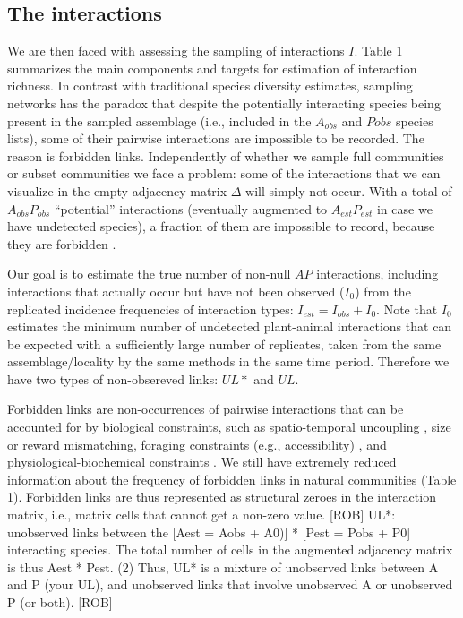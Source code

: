\documentclass[12pt]{article}
\begin{document}

\subsection*{The interactions}

We are then faced with assessing the sampling of interactions $I$. Table 1 summarizes the main components and targets for estimation of interaction richness. In contrast with traditional species diversity estimates, sampling networks has the paradox that despite the potentially interacting species being present in the sampled assemblage (i.e., included in the $A_{obs}$ and $P{obs}$ species lists), some of their pairwise interactions are impossible to be recorded. The reason is forbidden links. Independently of whether we sample full communities or subset communities we face a problem: some of the interactions that we can visualize in the empty adjacency matrix $\Delta$ will simply not occur. With a total of $A_{obs}P_{obs}$ ``potential'' interactions (eventually augmented to $A_{est}P_{est}$ in case we have undetected species), a fraction of them are impossible to record, because they are forbidden \citep{E31.7324_PDF,Olesen:2011a}. 

Our goal is to estimate the true number of non-null $AP$ interactions, including interactions that actually occur but have not been observed ($I_0$) from the replicated incidence frequencies of interaction types: $I_{est} = I_{obs} + I_0$. Note that $I_0$ estimates the minimum number of undetected plant-animal interactions that can be expected with a sufficiently large number of replicates, taken from the same assemblage/locality by the same methods in the same time period. Therefore we have two types of non-obsereved links: $UL*$ and $UL$. 

Forbidden links are non-occurrences of pairwise interactions that can be accounted for by biological constraints, such as spatio-temporal uncoupling \citep{E31/2562}, size or reward mismatching, foraging constraints (e.g., accessibility) \citep{More:2012kx}, and physiological-biochemical constraints \citep{E31/2562}. We still have extremely reduced information about the frequency of forbidden links in natural communities \citep{E31.7324_PDF,Stang:2009cx,Vazquez:2009p82,Olesen:2011a,Ibanez:2012eu,Maruyama:2014gt,Vizentin-Bugoni:2014hc} (Table 1). Forbidden links are thus represented as structural zeroes in the interaction matrix, i.e., matrix cells that cannot get a non-zero value. 
[ROB]
UL*: unobserved links between the [Aest = Aobs + A0)] * [Pest = Pobs + P0] interacting species. The total number of cells in the augmented adjacency matrix is thus Aest * Pest.
(2) Thus, UL* is a mixture of unobserved links between A and P (your UL), and unobserved links that involve unobserved A or unobserved P (or both).
[ROB]
\end{document}
